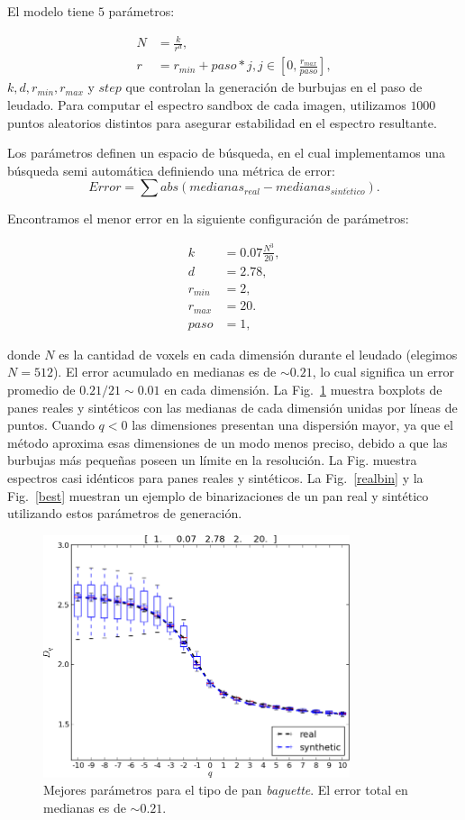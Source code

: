 El modelo tiene $5$ parámetros:

\begin{align*}
N &= \frac{k}{r^{d}},\\ r &= r_{min}+paso*j, j \in [0,\frac{r_{max}}{paso}],
\end{align*}
$k,d,r_{min},r_{max}$ y $step$ que controlan la generación de burbujas en el paso de leudado.
Para computar el espectro sandbox de cada imagen, utilizamos $1000$ puntos aleatorios distintos para asegurar estabilidad en el espectro resultante.

Los parámetros definen un espacio de búsqueda, en el cual implementamos una búsqueda semi automática definiendo una métrica de error:
\begin{equation*}
Error = \displaystyle \sum abs(medianas_{real}-medianas_{sint\acute{e}tico}).
\end{equation*}

Encontramos el menor error en la siguiente configuración de parámetros:

\begin{align*}
k &= 0.07 \frac{N^{3}}{20} ,\\
d &=2.78,\\
r_{min} &=2,\\
r_{max} &=20.\\
paso &=1,
\end{align*}

donde $N$ es la cantidad de voxels en cada dimensión durante el leudado (elegimos $N = 512$). 
El error acumulado en medianas es de $\sim 0.21$, lo cual significa un error promedio de $0.21/21 \sim 0.01$ en cada dimensión.
La Fig.~\ref{bestboxplot} muestra boxplots de panes reales y sintéticos con las medianas de cada dimensión unidas por líneas de puntos.
Cuando $q < 0$ las dimensiones presentan una dispersión mayor, ya que el método aproxima esas dimensiones de un modo menos preciso, debido a que las burbujas más pequeñas poseen un límite en la resolución.
La Fig. muestra espectros casi idénticos para panes reales y sintéticos.
La Fig.~\ref{realbin} y la Fig.~\ref{best} muestran un ejemplo de binarizaciones de un pan real y sintético utilizando estos parámetros de generación.


\begin{figure}[!ht]
\includegraphics[width=9cm]{figures/bestboxplot}
\caption[Mejores parámetros de síntesis para el tipo de pan {\em baguette}]{Mejores parámetros para el tipo de pan {\em baguette}. El error total en medianas es de $\sim 0.21$.}
\label{bestboxplot}
\end{figure}

